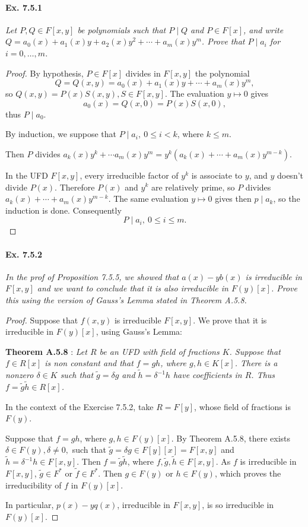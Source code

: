 \documentclass[11pt,a4paper]{article}
\begin{document}
\paragraph{Ex. 7.5.1}

{\it Let $P,Q \in F[x,y]$ be polynomials such that $P\mid Q$ and $P\in F[x]$, and write $Q= a_0(x)+a_1(x)y+a_2(x)y^2+\cdots+a_m(x)y^m$. Prove that $P\mid a_i$ for $i=0,\ldots,m$.
}

\begin{proof}
By hypothesis, $P \in F[x]$ divides in $F[x,y]$ the polynomial 
$$Q = Q(x,y) = a_0(x)+a_1(x)y+\cdots+a_m(x)y^m,$$
so $Q(x,y) = P(x)S(x,y) , S \in F[x,y]$. The evaluation $y \mapsto 0$ gives 
$$a_0(x) = Q(x,0) = P(x)S(x,0),$$
thus $P \mid a_0$.

By induction, we suppose that $P \mid a_i, \ 0 \leq i < k$, where $k\leq m$.

Then $P$ divides $a_k(x)y^k+\cdots a_m(x)y^m = y^k(a_k(x)+ \cdots + a_m(x) y^{m-k})$.

In the UFD $F[x,y]$, every irreducible factor of $y^k$ is associate to $y$, and $y$ doesn't divide $P(x)$. Therefore $P(x)$ and $y^k$ are relatively prime, so $P$ divides $a_k(x)+ \cdots + a_m(x) y^{m-k}$. The same evaluation $y\mapsto 0$ gives then $p \mid a_k$, so the induction is done. Consequently
$$P \mid a_i,\  0 \leq i \leq m.$$
\end{proof}

\paragraph{Ex. 7.5.2} 

{\it In the prof of Proposition 7.5.5, we showed that $a(x) - yb(x)$ is irreducible in $F[x,y]$ and we want to conclude that it is also irreducible in $F(y)[x]$. Prove this using the version of Gauss's Lemma stated in Theorem A.5.8.
}

\begin{proof}
Suppose that $f(x,y) $ is irreducible $F[x,y]$.  We prove that it is irreducible in $F(y)[x]$, using Gauss's Lemma: 

{\bf Theorem A.5.8} :
{\it Let $R$ be an UFD with field of fractions $K$. Suppose that $f \in R[x]$ is non constant and that $f = gh$, where $g,h \in K[x]$. There is a nonzero $\delta \in K$ such that $\tilde{g} = \delta g$ and $\tilde{h} = \delta^{-1}h$ have coefficients in $R$. Thus $f = \tilde{g} \tilde{h} \in R[x]$.}

In the context of the Exercise 7.5.2, take $R = F[y]$, whose field of fractions is $F(y)$.

Suppose that $f = gh$, where $g,h \in F(y)[x]$. By Theorem A.5.8, there exists $\delta \in F(y),\delta \neq 0,$ such that $\tilde{g} = \delta g \in F[y][x] = F[x,y]$ and $\tilde{h} = \delta^{-1} h \in F[x,y]$. Then $f = \tilde{g} \tilde{h}$, where $f, \tilde{g},\tilde{h} \in F[x,y]$. As $f$ is irreducible in $F[x,y]$, $\tilde{g} \in F^*$ or $\tilde{f} \in F^*$. Then $g \in F(y)$ or $h\in F(y)$, which proves the irreducibility of $f$ in $F(y)[x]$.

In particular, $p(x) - y q(x)$, irreducible in $F[x,y]$, is so irreducible in $F(y)[x]$.
\end{proof}
\end{document}
